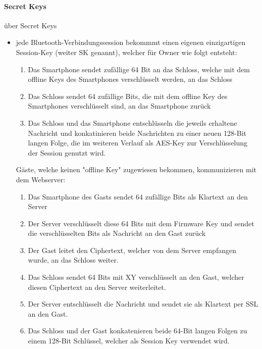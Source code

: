 		\paragraph{Secret Keys}
		über Secret Keys\cite{Fuller2017}
		\begin{itemize}
		    \item jede Bluetooth-Verbindungssession bekommmt einen eigenen einzigartigen Session-Key (weiter SK genannt), welcher für Owner wie folgt entsteht:
		        \begin{enumerate}
		            \item Das Smartphone sendet zufällige 64 Bit an das Schloss, welche mit dem offline Keys des Smartphones verschlüsselt werden, an das Schloss
		            \item Das Schloss sendet 64 zufällige Bits, die mit dem offline Key des Smartphones verschlüsselt sind, an das Smartphone zurück
		            \item Das Schloss und das Smartphone entschlüsseln die jeweils erhaltene Nachricht und konkatinieren beide Nachrichten zu einer neuen 128-Bit langen Folge, die im weiteren Verlauf als AES-Key zur Verschlüsselung der Session genutzt wird.
		        \end{enumerate}
		        Gäste, welche keinen "offline Key" zugewiesen bekommen, kommunizieren mit dem Webserver:
		        \begin{enumerate}
		            \item Das Smartphone des Gasts sendet 64 zufällige Bits als Klartext an den Server
		            \item Der Server verschlüsselt diese 64 Bits mit dem Firmware Key und sendet die verschlüsselten Bits als Nachricht an den Gast zurück
		            \item Der Gast leitet den Ciphertext, welcher von dem Server empfangen wurde, an das Schloss weiter.
		            \item Das Schloss sendet 64 Bits mit XY  verschlüsselt an den Gast, welcher diesen Ciphertext an den Server weiterleitet.
		            \item Der Server entschlüsselt die Nachricht und sendet sie als Klartext per SSL an den Gast.
		            \item Das Schloss und der Gast konkatenieren beide 64-Bit langen Folgen zu einem 128-Bit Schlüssel, welcher als Session Key verwendet wird.
		        \end{enumerate}

\end{itemize}
